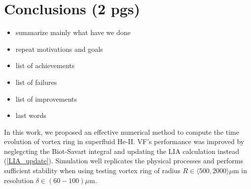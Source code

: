 \chapter{Conclusions (2 pgs)}

\begin{itemize}
	\item summarize mainly what have we done
	\item repeat motivations and goals
	\item list of achievements
	\item list of failures
	\item list of improvements
	\item last words
\end{itemize}

In this work, we proposed an effective numerical method to compute the time evolution of vortex ring in superfluid He-II. VF's performance was improved by neglegcting the Biot-Savart integral and updating the LIA calculation instead (\ref{LIA_update}). Simulation well replicates the physical processes and performs sufficient stability when using testing vortex ring of radius $R \in \langle 500, 2000\rangle\mu\text{m}$ in resolution $\delta \in (60-100)\mu\text{m}$.

\newpage
